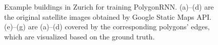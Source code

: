 \begin{figure}[!h]
    \caption{Example buildings in Zurich for training PolygonRNN. (a)--(d) are the original satellite images obtained by Google Static Maps API. (e)--(g) are (a)--(d) covered by the corresponding polygons' edges, which are visualized based on the ground truth.}
	\label{fig:egbui}
\end{figure}